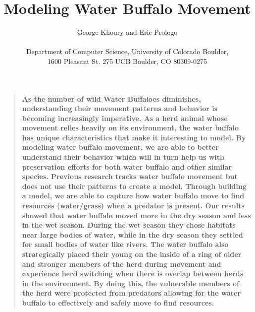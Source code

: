 \documentclass[12pt]{article}
\title{Modeling Water Buffalo Movement}
\author
{George Khoury and Eric Prologo\\
\\
\normalsize{Department of Computer Science, University of Colorado Boulder,}\\
\normalsize{1600 Pleasant St.
275 UCB
Boulder, CO 80309-0275}\\
}
\date{}
\newenvironment{sciabstract}{%
\begin{quote} \bf}
{\end{quote}}
\begin{document}
 


\baselineskip24pt


\maketitle 




\begin{sciabstract}
As the number of wild Water Buffaloes diminishes, understanding their movement patterns and behavior is becoming increasingly imperative. As a herd animal whose movement relies heavily on its environment, the water buffalo has unique characteristics that make it interesting to model. By modeling water buffalo movement, we are able to better understand their behavior which will in turn help us with preservation efforts for both water buffalo and other similar species. Previous research tracks water buffalo movement but does not use their patterns to create a model. Through building a model, we are able to capture how water buffalo move to find resources (water/grass) when a predator is present. Our results showed that water buffalo moved more in the dry season and less in the wet season. During the wet season they chose habitats near large bodies of water, while in the dry season they settled for small bodies of water like rivers. The water buffalo also strategically placed their young on the inside of a ring of older and stronger members of the herd during movement and experience herd switching when there is overlap between herds in the environment. By doing this, the vulnerable members of the herd were protected from predators allowing for the water buffalo to effectively and safely move to find resources.
\end{sciabstract}



\end{document}
